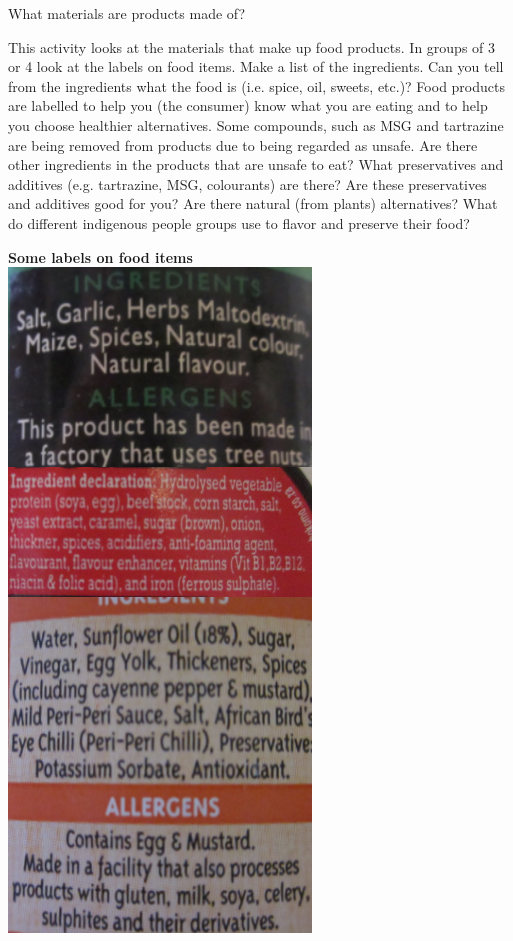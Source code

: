     \label{m38708*eip-344}\begin{activity}{What materials are products made of?}
{
\begin{minipage}{.65\textwidth}
This activity looks at the materials that make up food products. In groups of 3 or 4 look at the labels on food items. Make a list of the ingredients. Can you tell from the ingredients what the food is (i.e. spice, oil, sweets, etc.)? Food products are labelled to help you (the consumer) know what you are eating and to help you choose healthier alternatives. Some compounds, such as MSG and tartrazine are being removed from products due to being regarded as unsafe. Are there other ingredients in the products that are unsafe to eat? What preservatives and additives (e.g. tartrazine, MSG, colourants) are there? Are these preservatives and additives good for you? Are there natural (from plants) alternatives? What do different indigenous people groups use to flavor and preserve their food? 
\end{minipage}
\begin{minipage}{.25\textwidth}
 \begin{center}
\textbf{Some labels on food items}\\
 \includegraphics[height=1.7\textwidth]{photos/food_labels.png}

\end{center}
\end{minipage}}
\end{activity}
